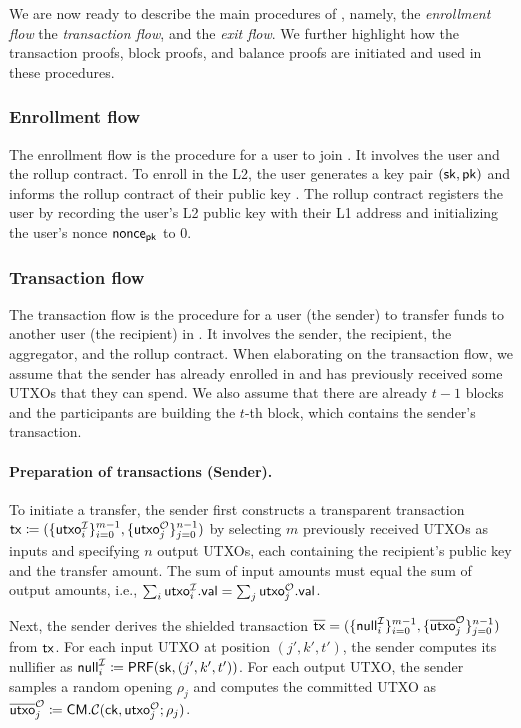 We are now ready to describe the main procedures of \Protocol, namely, the \textit{enrollment flow} the \textit{transaction flow}, and the \textit{exit flow}.
We further highlight how the transaction proofs, block proofs, and balance proofs are initiated and used in these procedures.

\subsubsection{Enrollment flow}

The enrollment flow is the procedure for a user to join \Protocol.
It involves the user and the rollup contract.
To enroll in the \ac{L2}, the user generates a key pair $({\mathsf{sk}}, {\mathsf{pk}})$ and informs the rollup contract of their public key \Pk.
The rollup contract registers the user by recording the user's \ac{L2} public key \Pk with their \ac{L1} address \Address and initializing the user's nonce $\mathsf{nonce}_{\mathsf{pk}}$ to 0.

\subsubsection{Transaction flow}

The transaction flow is the procedure for a user (the sender) to transfer funds to another user (the recipient) in \Protocol.
It involves the sender, the recipient, the aggregator, and the rollup contract.
When elaborating on the transaction flow, we assume that the sender has already enrolled in \Protocol and has previously received some \acp{UTXO} that they can spend.
We also assume that there are already $t - 1$ blocks and the participants are building the $t$-th block, which contains the sender's transaction.

\paragraph{Preparation of transactions (Sender).}

To initiate a transfer, the sender first constructs a transparent transaction $\mathsf{tx} \coloneqq (\{ \mathsf{utxo}^\mathcal{I}_i \}^{m - 1}_{i = 0}, \{ \mathsf{utxo}^\mathcal{O}_j \}^{n - 1}_{j = 0})$ by selecting $m$ previously received \acp{UTXO} as inputs and specifying $n$ output \acp{UTXO}, each containing the recipient's public key and the transfer amount.
The sum of input amounts must equal the sum of output amounts, i.e., $\sum_{i} \mathsf{utxo}^\mathcal{I}_i.\mathsf{val} = \sum_{j} \mathsf{utxo}^\mathcal{O}_j.\mathsf{val}$.

Next, the sender derives the shielded transaction $\overline{\mathsf{tx}} = (\{ \mathsf{null}^\mathcal{I}_i \}^{m - 1}_{i = 0}, \{ \overline{\mathsf{utxo}}^\mathcal{O}_j \}^{n - 1}_{j = 0})$ from $\mathsf{tx}$.
For each input \ac{UTXO} at position $(j', k', t')$, the sender computes its nullifier as $\mathsf{null}^\mathcal{I}_i \coloneqq \mathsf{PRF}({\mathsf{sk}}, (j', k', t'))$.
For each output \ac{UTXO}, the sender samples a random opening $\rho_j$ and computes the committed \ac{UTXO} as $\overline{\mathsf{utxo}}^\mathcal{O}_j \coloneqq \mathsf{\mathsf{CM}.\mathcal{C}}({\mathsf{ck}}, \mathsf{utxo}^\mathcal{O}_j; \rho_j)$.

